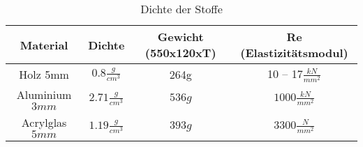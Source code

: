 \begin{table}[h!]
	\centering

	\begin{tabular}{|c|c|c|c|}
		\hline Material & Dichte & Gewicht (550x120xT) & Re (Elastizitätsmodul) \\ 
		\hline Holz 5mm & $0.8 \frac{g}{cm^3}$ & 264g & 10 – 17$\frac{kN}{mm^2}$ \\ 
		\hline Aluminium $3 mm$ & $2.71 \frac{g}{cm^3}$ & $536 g$ & $1000 \frac{kN}{mm^2}$ \\ 
		\hline Acrylglas $5 mm$ & $1.19 \frac{g}{cm^3}$ & $393 g$ & $3300 \frac{N}{mm^2}$  \\ 
		\hline 
	\end{tabular} 
	\caption{Dichte der Stoffe}
\end{table}
 		
 			

